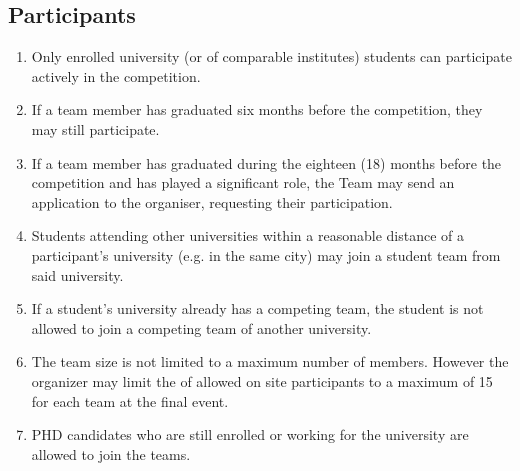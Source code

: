     \subsection{Participants}
    \begin{enumerate}
      \item Only enrolled university (or of comparable institutes) students can participate actively in the competition.
      \item If a team member has graduated six months before the competition, they may still participate.
      \item If a team member has graduated during the eighteen (18) months before the competition and has played a significant role,
      the Team may send an application to the organiser, requesting their participation. 
      \item Students attending other universities within a reasonable distance of a participant's university (e.g. in the same city) may join
      a student team from said university.
      \item If a student's university already has a competing team, the student is not allowed to join a competing team of 
      another university.  
      \item The team size is not limited to a maximum number of members. However the organizer may limit the of allowed on site participants to a maximum of 15 for each team at the final event.
      \item PHD candidates who are still enrolled or working for the university are allowed to join the teams. 
    \end{enumerate}

